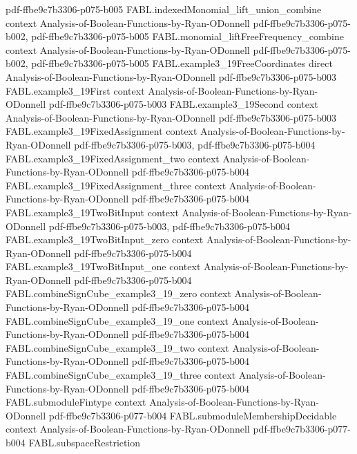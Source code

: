 \begin{theorem}
{    pdf-ffbe9c7b3306-p075-b005}
\proofstep
  {FABL.indexedMonomial_lift_union_combine}
  {context}
  {Analysis-of-Boolean-Functions-by-Ryan-ODonnell}
  {pdf-ffbe9c7b3306-p075-b002,
    pdf-ffbe9c7b3306-p075-b005}
\proofstep
  {FABL.monomial_liftFreeFrequency_combine}
  {context}
  {Analysis-of-Boolean-Functions-by-Ryan-ODonnell}
  {pdf-ffbe9c7b3306-p075-b002,
    pdf-ffbe9c7b3306-p075-b005}
\proofstep
  {FABL.example3_19FreeCoordinates}
  {direct}
  {Analysis-of-Boolean-Functions-by-Ryan-ODonnell}
  {pdf-ffbe9c7b3306-p075-b003}
\proofstep
  {FABL.example3_19First}
  {context}
  {Analysis-of-Boolean-Functions-by-Ryan-ODonnell}
  {pdf-ffbe9c7b3306-p075-b003}
\proofstep
  {FABL.example3_19Second}
  {context}
  {Analysis-of-Boolean-Functions-by-Ryan-ODonnell}
  {pdf-ffbe9c7b3306-p075-b003}
\proofstep
  {FABL.example3_19FixedAssignment}
  {context}
  {Analysis-of-Boolean-Functions-by-Ryan-ODonnell}
  {pdf-ffbe9c7b3306-p075-b003,
    pdf-ffbe9c7b3306-p075-b004}
\proofstep
  {FABL.example3_19FixedAssignment_two}
  {context}
  {Analysis-of-Boolean-Functions-by-Ryan-ODonnell}
  {pdf-ffbe9c7b3306-p075-b004}
\proofstep
  {FABL.example3_19FixedAssignment_three}
  {context}
  {Analysis-of-Boolean-Functions-by-Ryan-ODonnell}
  {pdf-ffbe9c7b3306-p075-b004}
\proofstep
  {FABL.example3_19TwoBitInput}
  {context}
  {Analysis-of-Boolean-Functions-by-Ryan-ODonnell}
  {pdf-ffbe9c7b3306-p075-b003,
    pdf-ffbe9c7b3306-p075-b004}
\proofstep
  {FABL.example3_19TwoBitInput_zero}
  {context}
  {Analysis-of-Boolean-Functions-by-Ryan-ODonnell}
  {pdf-ffbe9c7b3306-p075-b004}
\proofstep
  {FABL.example3_19TwoBitInput_one}
  {context}
  {Analysis-of-Boolean-Functions-by-Ryan-ODonnell}
  {pdf-ffbe9c7b3306-p075-b004}
\proofstep
  {FABL.combineSignCube_example3_19_zero}
  {context}
  {Analysis-of-Boolean-Functions-by-Ryan-ODonnell}
  {pdf-ffbe9c7b3306-p075-b004}
\proofstep
  {FABL.combineSignCube_example3_19_one}
  {context}
  {Analysis-of-Boolean-Functions-by-Ryan-ODonnell}
  {pdf-ffbe9c7b3306-p075-b004}
\proofstep
  {FABL.combineSignCube_example3_19_two}
  {context}
  {Analysis-of-Boolean-Functions-by-Ryan-ODonnell}
  {pdf-ffbe9c7b3306-p075-b004}
\proofstep
  {FABL.combineSignCube_example3_19_three}
  {context}
  {Analysis-of-Boolean-Functions-by-Ryan-ODonnell}
  {pdf-ffbe9c7b3306-p075-b004}
\proofstep
  {FABL.submoduleFintype}
  {context}
  {Analysis-of-Boolean-Functions-by-Ryan-ODonnell}
  {pdf-ffbe9c7b3306-p077-b004}
\proofstep
  {FABL.submoduleMembershipDecidable}
  {context}
  {Analysis-of-Boolean-Functions-by-Ryan-ODonnell}
  {pdf-ffbe9c7b3306-p077-b004}
\proofstep
  {FABL.subspaceRestriction}

\end{theorem}
